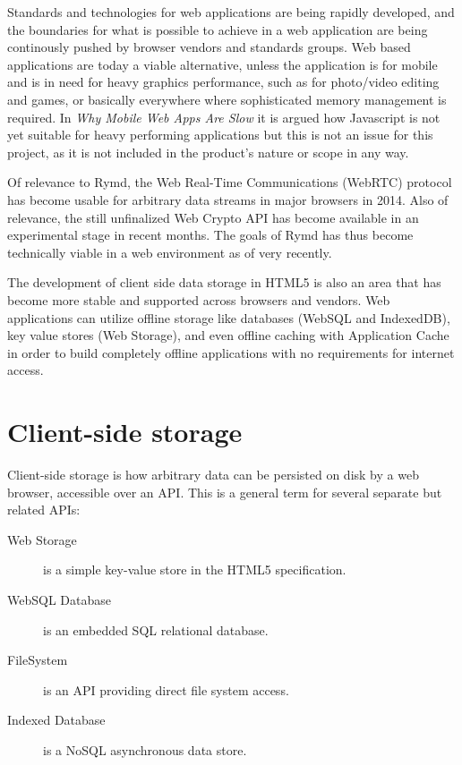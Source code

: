 Standards and technologies for web applications are being rapidly developed, and the boundaries for what is possible to achieve in a web application are being continously pushed by browser vendors and standards groups. Web based applications are today a viable alternative, unless the application is for mobile and is in need for heavy graphics performance, such as for photo/video editing and games, or basically everywhere where sophisticated memory management is required. In \emph{Why Mobile Web Apps Are Slow} \cite{MobileApps:Online} it is argued how Javascript is not yet suitable for heavy performing applications but this is not an issue for this project, as it is not included in the product's nature or scope in any way.

Of relevance to Rymd, the Web Real-Time Communications (WebRTC) protocol \cite{WebRTC:Online} has become usable for arbitrary data streams in major browsers in 2014. Also of relevance, the still unfinalized Web Crypto API \cite{WebCrypto:Online} has become available in an experimental stage in recent months. The goals of Rymd has thus become technically viable in a web environment as of very recently.

The development of client side data storage in HTML5 is also an area that has become more stable and supported across browsers and vendors. Web applications can utilize offline storage like databases (WebSQL and IndexedDB), key value stores (Web Storage), and even offline caching with Application Cache \cite{OfflineWebApps:Online} in order to build completely offline applications with no requirements for internet access.

\section{Client-side storage}

Client-side storage is how arbitrary data can be persisted on disk by a web browser, accessible over an API. This is a general term for several separate but related APIs:

\begin{description}
  \item[Web Storage]\cite{WebStorage:Online} is a simple key-value store in the HTML5 specification.
  \item[WebSQL Database]\cite{WebSQL:Online} is an embedded SQL relational database.
  \item[FileSystem]\cite{FileSystem:Online} is an API providing direct file system access.
  \item[Indexed Database]\cite{IndexedDB:Online} is a NoSQL asynchronous data store.
\end{description}

